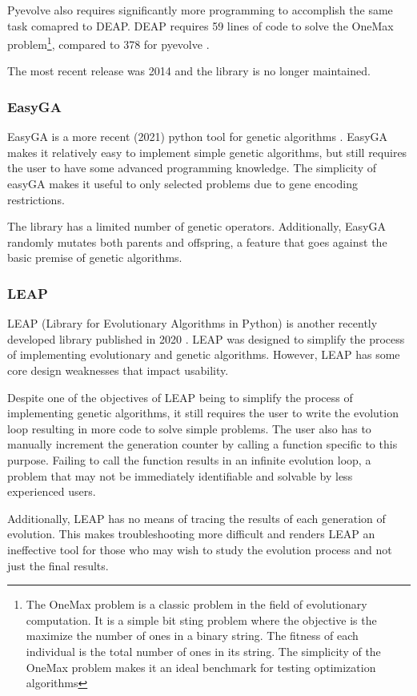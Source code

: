 \documentclass[12pt]{report}
\begin{document}
Pyevolve also requires significantly more programming to accomplish the same task comapred to DEAP. DEAP requires 59 lines of code to solve the OneMax problem\footnote{The OneMax problem is a classic problem in the field of evolutionary computation. It is a simple bit sting problem where the objective is the maximize the number of ones in a binary string. The fitness of each individual is the total number of ones in its string. The simplicity of the OneMax problem makes it an ideal benchmark for testing optimization algorithms}, compared to 378 for pyevolve \cite{LEAP}. 

The most recent release was 2014 and the library is no longer maintained.

\subsubsection{EasyGA}
EasyGA is a more recent (2021) python tool for genetic algorithms \cite{easyGA}. EasyGA makes it relatively easy to implement simple genetic algorithms, but still requires the user to have some advanced programming knowledge. The simplicity of easyGA makes it useful to only selected problems due to gene encoding restrictions.

The library has a limited number of genetic operators. Additionally, EasyGA randomly mutates both parents and offspring, a feature that goes against the basic premise of genetic algorithms. 

\subsubsection{LEAP}
LEAP (Library for Evolutionary Algorithms in Python) is another recently developed library published in 2020 \cite{LEAP}. LEAP was designed to simplify the process of implementing evolutionary and genetic algorithms. However, LEAP has some core design weaknesses that impact usability. 

Despite one of the objectives of LEAP being to simplify the process of implementing genetic algorithms, it still requires the user to write the evolution loop resulting in more code to solve simple problems. The user also has to manually increment the generation counter by calling a function specific to this purpose. Failing to call the function results in an infinite evolution loop, a problem that may not be immediately identifiable and solvable by less experienced users.

Additionally, LEAP has no means of tracing the results of each generation of evolution. This makes troubleshooting more difficult and renders LEAP an ineffective tool for those who may wish to study the evolution process and not just the final results.
\end{document}
